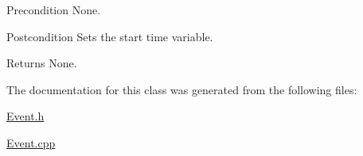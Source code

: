 \begin{DoxyPrecond}{Precondition}
None. 
\end{DoxyPrecond}
\begin{DoxyPostcond}{Postcondition}
Sets the start time variable. 
\end{DoxyPostcond}
\begin{DoxyReturn}{Returns}
None. 
\end{DoxyReturn}


The documentation for this class was generated from the following files\+:\begin{DoxyCompactItemize}
\item 
\hyperlink{_event_8h}{Event.\+h}\item 
\hyperlink{_event_8cpp}{Event.\+cpp}\end{DoxyCompactItemize}
